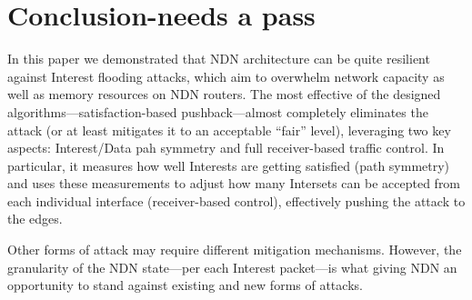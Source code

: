 \section{Conclusion{\color{red}-needs a pass}}
\label{sec:conclusion}





In this paper we demonstrated that NDN architecture can be quite resilient against Interest flooding attacks, which aim to overwhelm network capacity as well as memory resources on NDN routers.
The most effective of the designed algorithms---satisfaction-based pushback---almost completely eliminates the attack (or at least mitigates it to an acceptable ``fair'' level), leveraging two key aspects: Interest/Data pah symmetry and full receiver-based traffic control.
In particular, it measures how well Interests are getting satisfied (path symmetry) and uses these measurements to adjust how many Intersets can be accepted from each individual interface (receiver-based control), effectively pushing the attack to the edges.

Other forms of attack may require different mitigation mechanisms.  
However, the granularity of the NDN state---per each Interest packet---is what giving NDN an opportunity to stand against existing and new forms of attacks.




